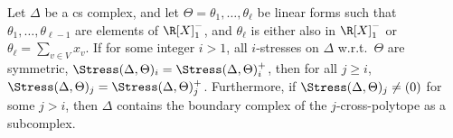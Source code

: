 \begin{theorem}\label{main theorem prep}
	Let $\Delta$ be a cs complex, and let $\Theta=\theta_1,\ldots,\theta_\ell$ be linear forms such that $\theta_1,\ldots,\theta_{\ell-1}$ are elements of $\R[X]^-_1$, and $\theta_\ell$ is either also in $\R[X]^-_1$ or $\theta_\ell=\sum_{v\in V} x_v$. If for some integer $i>1$, all $i$-stresses on $\Delta$ w.r.t.~$\Theta$ are symmetric, \ie $\Stress(\Delta,\Theta)_i=\Stress(\Delta,\Theta)^+_i$, then for all $j\geq i$, $\Stress(\Delta,\Theta)_{j}=\Stress(\Delta,\Theta)^+_{j}$. Furthermore, if $\Stress(\Delta,\Theta)_{j}\neq (0)$ for some $j> i$, then $\Delta$ contains the boundary complex of the $j$-cross-polytope as a subcomplex.
\end{theorem}
